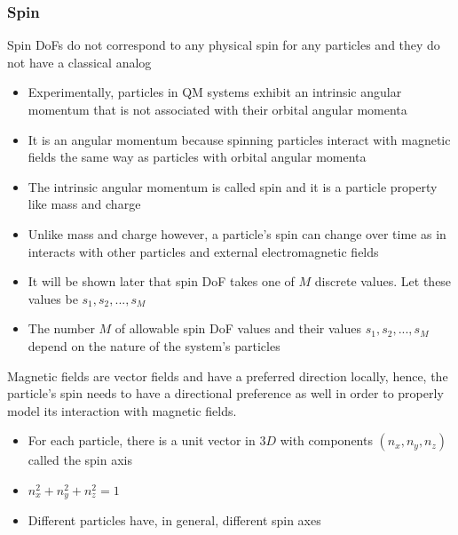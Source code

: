 \documentclass[8pt,t,mathserif,aspectratio=169]{beamer}
\begin{document}
\begin{frame}
  \frametitle{Spin}
  \vspace{1mm}
  Spin DoFs do not correspond to any physical spin for any particles and they do not have a classical analog
  \begin{itemize}
    \item Experimentally, particles in QM systems exhibit an intrinsic angular momentum that is not associated with their orbital angular momenta
    \item It is an angular momentum because spinning particles interact with magnetic fields the same way as particles with orbital angular momenta 
    \item The intrinsic angular momentum is called spin and it is a particle property like mass and charge
    \item Unlike mass and charge however, a particle's spin can change over time as in interacts with other particles and external electromagnetic fields
    \item It will be shown later that spin DoF takes one of $M$ discrete values. Let these values be $s_1,s_2,...,s_M$
    \item The number $M$ of allowable spin DoF values and their values $s_1,s_2,...,s_M$ depend on the nature of the system's particles
  \end{itemize}
  Magnetic fields are vector fields and have a preferred direction locally, hence, the particle's spin needs to have a directional preference as well in order to properly model its interaction with magnetic fields. 
  \begin{itemize}
    \item For each particle, there is a unit vector in $3D$ with components $(n_x,n_y,n_z)$ called the spin axis
    \item $n_x^2 + n_y^2 + n_z^2 = 1$
    \item Different particles have, in general, different spin axes
  \end{itemize}
\end{frame}
\end{document}
